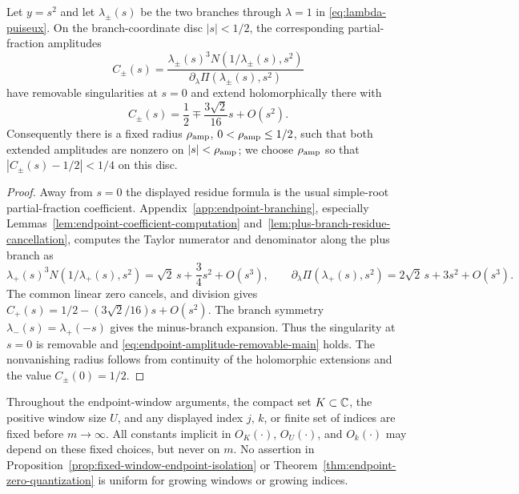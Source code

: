 \begin{lemma}\label{lem:endpoint-amplitude-removability}
Let $y=s^2$ and let $\lambda_\pm(s)$ be the two branches through $\lambda=1$ in \eqref{eq:lambda-puiseux}.  On the branch-coordinate disc $|s|<1/2$, the corresponding partial-fraction amplitudes
\[
C_\pm(s)=\frac{\lambda_\pm(s)^3N(1/\lambda_\pm(s),s^2)}{\partial_\lambda\Pi(\lambda_\pm(s),s^2)}
\]
have removable singularities at $s=0$ and extend holomorphically there with
\begin{equation}\label{eq:endpoint-amplitude-removable-main}
C_\pm(s)=\frac12\mp\frac{3\sqrt2}{16}s+O(s^2).
\end{equation}
Consequently there is a fixed radius $\rho_{\rm amp}$, $0<\rho_{\rm amp}\le1/2$, such that both extended amplitudes are nonzero on $|s|<\rho_{\rm amp}$; we choose $\rho_{\rm amp}$ so that $|C_\pm(s)-1/2|<1/4$ on this disc.
\end{lemma}
\begin{proof}
Away from $s=0$ the displayed residue formula is the usual simple-root partial-fraction coefficient.  Appendix~\ref{app:endpoint-branching}, especially Lemmas~\ref{lem:endpoint-coefficient-computation} and~\ref{lem:plus-branch-residue-cancellation}, computes the Taylor numerator and denominator along the plus branch as
\[
\lambda_+(s)^3N(1/\lambda_+(s),s^2)=\sqrt2\,s+\frac34s^2+O(s^3),
\qquad
\partial_\lambda\Pi(\lambda_+(s),s^2)=2\sqrt2\,s+3s^2+O(s^3).
\]
The common linear zero cancels, and division gives $C_+(s)=1/2-(3\sqrt2/16)s+O(s^2)$.  The branch symmetry $\lambda_-(s)=\lambda_+(-s)$ gives the minus-branch expansion.  Thus the singularity at $s=0$ is removable and \eqref{eq:endpoint-amplitude-removable-main} holds.  The nonvanishing radius follows from continuity of the holomorphic extensions and the value $C_\pm(0)=1/2$.
\end{proof}

Throughout the endpoint-window arguments, the compact set \(K\subset\mathbb{C}\), the positive window size \(U\), and any displayed index \(j\), \(k\), or finite set of indices are fixed before \(m\to\infty\).  All constants implicit in \(O_K(\cdot)\), \(O_U(\cdot)\), and \(O_k(\cdot)\) may depend on these fixed choices, but never on \(m\).  No assertion in Proposition~\ref{prop:fixed-window-endpoint-isolation} or Theorem~\ref{thm:endpoint-zero-quantization} is uniform for growing windows or growing indices.

